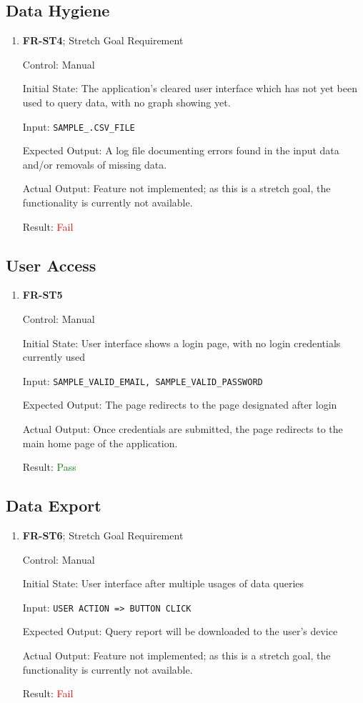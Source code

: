 \documentclass[12pt, titlepage]{article}
\begin{document}
\subsection{Data Hygiene}
\begin{enumerate}
  \item{\textbf{FR-ST4}}; Stretch Goal Requirement \label{FR:ST4}

Control: Manual

Initial State: The application's cleared user interface which has not yet been
used to query data, with no graph showing yet.

Input: \texttt{SAMPLE\_.CSV\_FILE}

Expected Output: A log file documenting errors found in the input data and/or
removals of missing data.

Actual Output: Feature not implemented; as this is a stretch goal, the
functionality is currently not available.

Result: \textcolor{red}{Fail}

\end{enumerate}

\subsection{User Access}
\begin{enumerate}
\item{\textbf{FR-ST5}} \label{FR:ST5}

Control: Manual

Initial State: User interface shows a login page, with no login credentials
currently used

Input: \texttt{SAMPLE\_VALID\_EMAIL, SAMPLE\_VALID\_PASSWORD}
                        
Expected Output: The page redirects to the page designated after login

Actual Output: Once credentials are submitted, the page redirects to the main
home page of the application.

Result: \textcolor{green}{Pass}
\end{enumerate}

\subsection{Data Export}
\begin{enumerate}
  \item{\textbf{FR-ST6}}; Stretch Goal Requirement \label{FR:ST6}

Control: Manual

Initial State: User interface after multiple usages of data queries

Input: \texttt{USER ACTION => BUTTON CLICK}

Expected Output: Query report will be downloaded to the user's device

Actual Output: Feature not implemented; as this is a stretch goal, the
functionality is currently not available.

Result: \textcolor{red}{Fail}
\end{enumerate}
\end{document}
